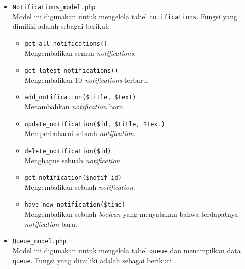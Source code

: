 \documentclass[a4paper,twoside]{article}
\begin{document}
\begin{enumerate}
\begin{itemize}
\begin{itemize}
			            \item \verb|Notifications_model.php| \\
			                  Model ini digunakan untuk mengelola tabel \verb|notifications|. Fungsi yang dimiliki adalah sebagai berikut:

			                  \begin{itemize}
				                  \item \verb|get_all_notifications()| \\
				                        Mengembalikan semua \textit{notifications}.
				                  \item \verb|get_latest_notifications()| \\
				                        Mengembalikan 10 \textit{notifications} terbaru.
				                  \item \verb|add_notification($title, $text)| \\
				                        Menambahkan \textit{notification} baru.
				                  \item \verb|update_notification($id, $title, $text)| \\
				                        Memperbaharui sebuah \textit{notification}.
				                  \item \verb|delete_notification($id)| \\
				                        Menghapus sebuah \textit{notification}.
				                  \item \verb|get_notification($notif_id)| \\
				                        Mengembalikan sebuah \textit{notification}.
				                  \item \verb|have_new_notification($time)| \\
				                        Mengembalikan sebuah \textit{boolean} yang menyatakan bahwa terdapatnya \textit{notification} baru.
			                  \end{itemize}

			            \item \verb|Queue_model.php| \\
			                  Model ini digunakan untuk mengelola tabel \verb|queue| dan menampilkan data \verb|queue|. Fungsi yang dimiliki adalah sebagai berikut:


\end{itemize}
\end{itemize}
\end{enumerate}
\end{document}
